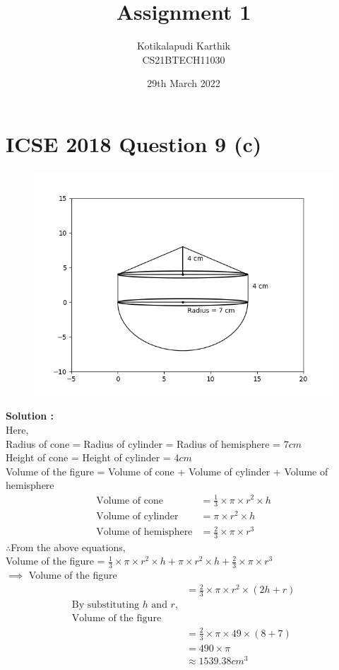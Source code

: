 \documentclass[journal,12pt,twocolumn]{IEEEtran}
\title{Assignment 1}
\author{Kotikalapudi Karthik \\
CS21BTECH11030}
\date{29th March 2022}
\begin{document}
\maketitle

\section*{ICSE 2018 Question 9 (c)}
\begin{figure}[ht!]
	  \centering 
	  \includegraphics[width=\columnwidth]{question9c.png}
\end{figure}
\textbf{Solution :}\\
Here,\\
Radius of cone = Radius of cylinder = Radius of hemisphere = $7cm$\\
Height of cone = Height of cylinder = $4cm$\\
Volume of the figure = Volume of cone + Volume of cylinder + Volume of hemisphere
\begin{align}
    \text{Volume of cone} &= \frac{1}{3} \times \pi \times r^2 \times h
    \\
    \text{Volume of cylinder} &= \pi \times r^2 \times h
    \\
    \text{Volume of hemisphere} &= \frac{2}{3} \times \pi \times r^3
\end{align}
$\therefore$From the above equations,\\
Volume of the figure = $\frac{1}{3} \times \pi \times r^2 \times h + \pi \times r^2 \times h + \frac{2}{3} \times \pi \times r^3$\\
$\implies$ Volume of the figure
\begin{align*}
    &= \frac{2}{3} \times \pi \times r^2 \times (2h+r)\\
    \text{By substituting $h$ and $r$,}\\
    \text{Volume of the figure}\\
    &= \frac{2}{3} \times \pi \times 49 \times (8+7)\\
    &= 490 \times \pi\\ 
    &\approx 1539.38cm^3
\end{align*}
\end{document}
